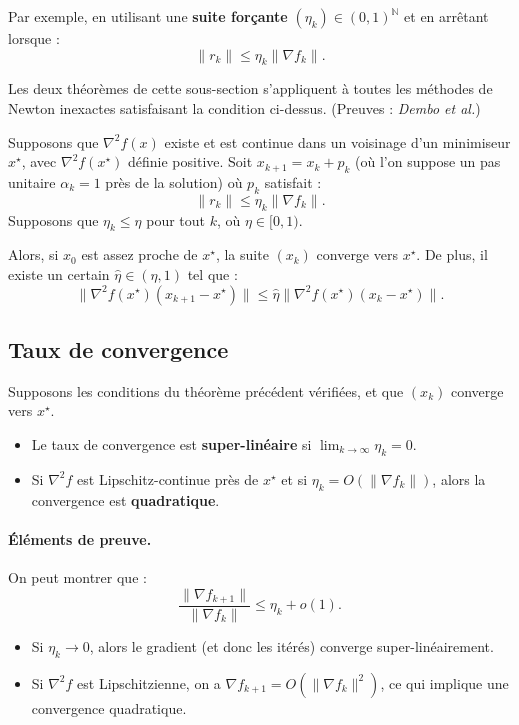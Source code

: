 Par exemple, en utilisant une \textbf{suite forçante} $(\eta_k) \in (0, 1)^\mathbb{N}$ et en arrêtant lorsque :
\begin{equation}
    \| r_k \| \le \eta_k \| \nabla f_k \|.
\end{equation}

Les deux théorèmes de cette sous-section s'appliquent à toutes les méthodes de Newton inexactes satisfaisant la condition ci-dessus.
(Preuves : \textit{Dembo et al.})

\begin{theoreme}
    Supposons que $\nabla^2 f(x)$ existe et est continue dans un voisinage d'un minimiseur $x^\star$, avec $\nabla^2 f(x^\star)$ définie positive.
    Soit $x_{k+1} = x_k + p_k$ (où l'on suppose un pas unitaire $\alpha_k=1$ près de la solution) où $p_k$ satisfait :
    \[
        \| r_k \| \le \eta_k \| \nabla f_k \|.
    \]
    Supposons que $\eta_k \le \eta$ pour tout $k$, où $\eta \in [0, 1)$.

    Alors, si $x_0$ est assez proche de $x^\star$, la suite $(x_k)$ converge vers $x^\star$.
    De plus, il existe un certain $\hat{\eta} \in (\eta, 1)$ tel que :
    \[
        \| \nabla^2 f(x^\star) (x_{k+1} - x^\star) \| \le \hat{\eta} \| \nabla^2 f(x^\star) (x_k - x^\star) \|.
    \]
\end{theoreme}

\subsection{Taux de convergence}

\begin{theoreme}
    Supposons les conditions du théorème précédent vérifiées, et que $(x_k)$ converge vers $x^\star$.
    \begin{itemize}
        \item Le taux de convergence est \textbf{super-linéaire} si $\lim_{k \to \infty} \eta_k = 0$.
        \item Si $\nabla^2 f$ est Lipschitz-continue près de $x^\star$ et si $\eta_k = O(\| \nabla f_k \|)$, alors la convergence est \textbf{quadratique}.
    \end{itemize}
\end{theoreme}

\paragraph{Éléments de preuve.}
On peut montrer que :
\[
    \frac{\| \nabla f_{k+1} \|}{\| \nabla f_k \|} \le \eta_k + o(1).
\]
\begin{itemize}
    \item Si $\eta_k \to 0$, alors le gradient (et donc les itérés) converge super-linéairement.
    \item Si $\nabla^2 f$ est Lipschitzienne, on a $\nabla f_{k+1} = O(\| \nabla f_k \|^2)$, ce qui implique une convergence quadratique.
\end{itemize}

